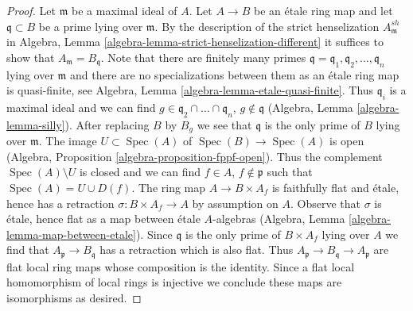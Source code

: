 \documentclass[10pt,a4paper]{amsart}
\theoremstyle{plain}
\theoremstyle{definition}
\theoremstyle{remark}
\numberwithin{equation}{subsection}
\def\Spec{\mathop{\mathrm{Spec}}}
\begin{document}
\begin{proof}
Let $\mathfrak m$ be a maximal ideal of $A$. Let $A \to B$ be an
\'etale ring map and let $\mathfrak q \subset B$ be a prime
lying over $\mathfrak m$. By the description of the strict henselization
$A_\mathfrak m^{sh}$ in
Algebra, Lemma \ref{algebra-lemma-strict-henselization-different}
it suffices to show that $A_\mathfrak m = B_\mathfrak q$.
Note that there are finitely many primes
$\mathfrak q = \mathfrak q_1, \mathfrak q_2, \ldots, \mathfrak q_n$
lying over $\mathfrak m$ and there are no specializations
between them as an \'etale ring map is quasi-finite, see
Algebra, Lemma \ref{algebra-lemma-etale-quasi-finite}.
Thus $\mathfrak q_i$ is a maximal ideal and we can find
$g \in \mathfrak q_2 \cap \ldots \cap \mathfrak q_n$, $g \not \in \mathfrak q$
(Algebra, Lemma \ref{algebra-lemma-silly}).
After replacing $B$ by $B_g$ we see that $\mathfrak q$
is the only prime of $B$ lying over $\mathfrak m$.
The image $U \subset \Spec(A)$ of $\Spec(B) \to \Spec(A)$ is
open (Algebra, Proposition \ref{algebra-proposition-fppf-open}).
Thus the complement $\Spec(A) \setminus U$ is closed
and we can find $f \in A$, $f \not \in \mathfrak p$ such that
$\Spec(A) = U \cup D(f)$. The ring map $A \to B \times A_f$
is faithfully flat and \'etale, hence has a retraction
$\sigma : B \times A_f \to A$ by assumption on $A$.
Observe that $\sigma$ is \'etale, hence flat as a map between \'etale
$A$-algebras (Algebra, Lemma \ref{algebra-lemma-map-between-etale}).
Since $\mathfrak q$ is the only prime of $B \times A_f$ lying
over $A$ we find that $A_\mathfrak p \to B_\mathfrak q$ has
a retraction which is also flat. Thus
$A_\mathfrak p \to B_\mathfrak q \to A_\mathfrak p$
are flat local ring maps whose composition is the identity. Since
a flat local homomorphism of local rings is injective we conclude these
maps are isomorphisms as desired.
\end{proof}
\end{document}
